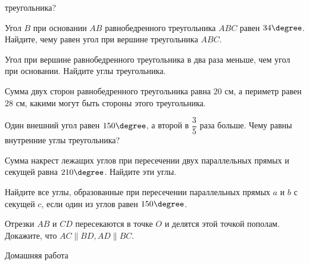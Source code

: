 \begin{class}[number=2]
\begin{listofex}
		треугольника?
		\item Угол \( B \) при основании \( AB \) равнобедренного треугольника \( ABC \) равен \( 34\degree \). Найдите, чему равен угол при вершине треугольника \( ABC \).
		\item Угол при вершине равнобедренного треугольника в два раза меньше, чем угол при основании. Найдите углы треугольника.
		\item Сумма двух сторон равнобедренного треугольника равна \( 20 \) см, а периметр равен \( 28 \) см, какими могут быть стороны этого треугольника.
		\item Один внешний угол равен \( 150\degree \), а второй в \( \dfrac{ 3 }{ 5 } \) раза больше. Чему равны внутренние углы треугольника?
		\item Сумма накрест лежащих углов при пересечении двух параллельных прямых и секущей равна \(210 \degree \). Найдите эти углы.
		\item Найдите все углы, образованные при пересечении параллельных прямых \(a\) и \(b\) с секущей \(c\), если один из углов равен \( 150 \degree \).
		\item Отрезки \(AB\) и \(CD\) пересекаются в точке \(O\) и делятся этой точкой пополам. Докажите, что \(AC \parallel BD, AD \parallel BC\).
	\end{listofex}
\end{class}

\begin{homework}[number=2]
	\begin{listofex}
		\item Домашняя работа
	\end{listofex}
\end{homework}


